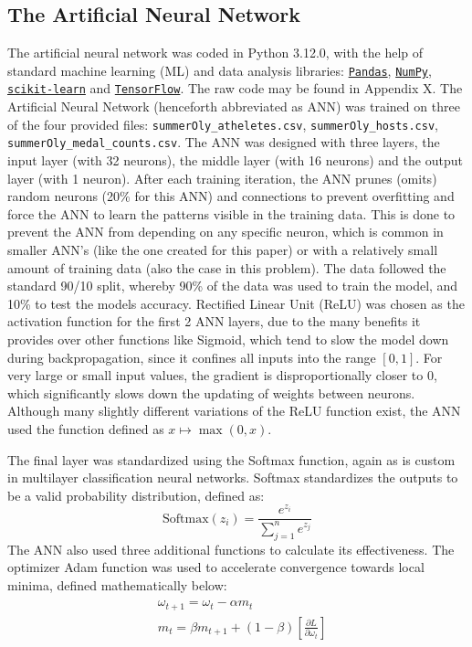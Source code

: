\documentclass{mcmthesis}
\begin{document}
\subsection{The Artificial Neural Network}
The artificial neural network was coded in Python 3.12.0, with the help of standard machine learning (ML) and data analysis libraries: \href{https://pandas.pydata.org/}{\texttt{Pandas}}, \href{https://numpy.org/}{\texttt{NumPy}}, \href{https://scikit-learn.org/stable/}{\texttt{scikit-learn}} and \href{https://www.tensorflow.org/}{\texttt{TensorFlow}}. The raw code may be found in Appendix X. The Artificial Neural Network (henceforth abbreviated as ANN) was trained on three of the four provided files: \texttt{summerOly\_atheletes.csv}, \texttt{summerOly\_hosts.csv}, \\ \texttt{summerOly\_medal\_counts.csv}. The ANN was designed with three layers, the input layer (with 32 neurons), the middle layer (with 16 neurons) and the output layer (with 1 neuron). After each training iteration, the ANN prunes (omits) random neurons (20\% for this ANN) and connections to prevent overfitting and force the ANN to learn the patterns visible in the training data. This is done to prevent the ANN from depending on any specific neuron, which is common in smaller ANN's (like the one created for this paper) or with a relatively small amount of training data (also the case in this problem). The data followed the standard 90/10 split, whereby 90\% of the data was used to train the model, and 10\% to test the models accuracy. Rectified Linear Unit (ReLU) was chosen as the activation function for the first 2 ANN layers, due to the many benefits it provides over other functions like Sigmoid, which tend to slow the model down during backpropagation, since it confines all inputs into the range $[0, 1]$. For very large or small input values, the gradient is disproportionally closer to 0, which significantly slows down the updating of weights between neurons. Although many slightly different variations of the ReLU function exist, the ANN used the function defined as $x\mapsto \max(0, x)$.

The final layer was standardized using the Softmax function, again as is custom in multilayer classification neural networks. Softmax standardizes the outputs to be a valid probability distribution, defined as:
\begin{equation}\label{eq:softmax}
    \text{Softmax}(z_i) = \frac{e^{z_i}}{\sum_{j=1}^{n} e^{z_j}}
\end{equation}
The ANN also used three additional functions to calculate its effectiveness. The optimizer Adam function was used to accelerate convergence towards local minima, defined mathematically below:
\begin{align}\label{eq:adam func}
    \begin{split}
    &\omega_{t+1}=\omega_t-\alpha m_t\\
    &m_t = \beta m_{t+1} + (1-\beta) \left[\frac{\partial L}{\partial \omega_t} \right]
    \end{split}
\end{align}
\end{document}
